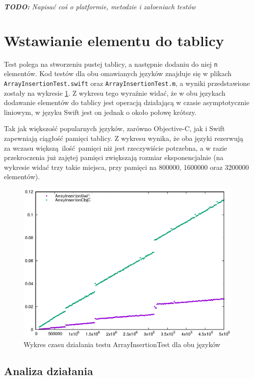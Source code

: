 \documentclass[mgr, shortabstract]{iithesis}
\newcommand{\todo}[1]{
  \textit{\textbf{TODO: }#1}
}
\newcommand{\swiftinline}[1]{
    \texttt{#1}
}
\begin{document}
\todo{Napisać coś o platformie, metodzie i załoeniach testów}

\section{Wstawianie elementu do tablicy}

Test polega na stworzeniu pustej tablicy, a następnie dodaniu do niej \swiftinline{n} elementów. Kod testów dla obu omawianych języków znajduje się w plikach \texttt{ArrayInsertionTest.swift} oraz \texttt{ArrayInsertionTest.m}, a wyniki przedstawione zostały na wykresie \ref{p:array_insertion}. Z wykresu tego wyraźnie widać, że w obu językach dodawanie elementów do tablicy jest operacją działającą w czasie asymptotycznie liniowym, w języku Swift jest on jednak o około połowę krótszy.

Tak jak większość popularnych języków, zarówno Objective-C, jak i Swift zapewniają ciągłość pamięci tablicy. Z wykresu wynika, że oba języki rezerwują za wczasu większą ilość pamięci niż jest rzeczywiście potrzebna, a w razie przekroczenia już zajętej pamięci zwiększają rozmiar eksponencjalnie (na wykresie widać trzy takie miejsca, przy pamięci na 800000, 1600000 oraz 3200000 elementów).

\begin{figure}
    \includegraphics{plots/ArrayInsertion.eps}
    \caption{Wykres czasu działania testu ArrayInsertionTest dla obu języków}
    \label{p:array_insertion}
\end{figure}

\subsection{Analiza działania}
\end{document}
